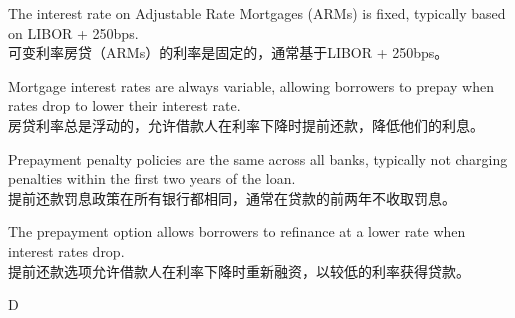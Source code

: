 \documentclass{article}
\begin{document}
            \begin{choices}
                \item The interest rate on Adjustable Rate Mortgages (ARMs) is fixed, typically based on LIBOR + 250bps.\\
                可变利率房贷（ARMs）的利率是固定的，通常基于LIBOR + 250bps。
                \item Mortgage interest rates are always variable, allowing borrowers to prepay when rates drop to lower their interest rate.\\
                房贷利率总是浮动的，允许借款人在利率下降时提前还款，降低他们的利息。
                \item Prepayment penalty policies are the same across all banks, typically not charging penalties within the first two years of the loan.\\
                提前还款罚息政策在所有银行都相同，通常在贷款的前两年不收取罚息。
                \item The prepayment option allows borrowers to refinance at a lower rate when interest rates drop.\\
                提前还款选项允许借款人在利率下降时重新融资，以较低的利率获得贷款。
            \end{choices}
            
            \begin{correctanswer}
                D
            \end{correctanswer}
\end{document}

